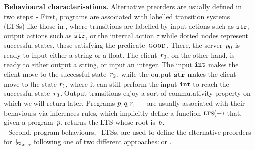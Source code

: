 {\bfseries Behavioural characterisations.}
Alternative preorders %
are usually
defined %
in two steps:
%
- First, programs are associated with labelled transition systems (LTSs)
like those in , where transitions are
labelled by input actions such as $\texttt{str}$, %
output actions such as $\overline{\texttt{str}}$, or the internal action
$\tau$ %
while dotted nodes represent successful states, \ie
those satisfying the predicate~$\textsc{good}$.
There, the server~$p_0$ is ready to input either a string or a
float.
  The client~$r_0$, on the other hand, is ready to either output
  a string, or input an integer. The input ${\tt int}$ makes the
  client move to the %
  successful state~$r_2$, while the output
  $\overline{\tt{str}}$ makes the client move to the state $r_1$, where it can
  still perform the input ${\tt int}$ to reach the %
  successful state~$r_3$. Output transitions enjoy a
  sort of %
  commutativity property on which we will return later.
  Programs $p, q, r, \ldots$ are usually
  associated with their behaviours via inferences rules, which
  implicitly define a function $\textsc{lts}( - )$ that, given a
  program~$p$, returns the LTS whose root is~$p$.\\
%
- Second, program behaviours, \ie~LTSs, are used to define the
alternative preorders for~$\testleqS$ %
following one of two different
approaches: \MustSets or \AcceptanceSets.


